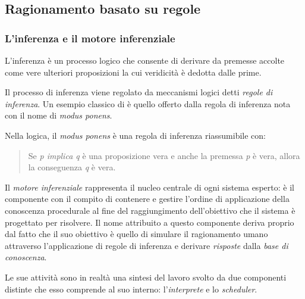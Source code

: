 \subsection{Ragionamento basato su regole}

\subsubsection{L'inferenza e il motore inferenziale}

L'inferenza è un processo logico che consente di derivare da premesse accolte come vere  ulteriori proposizioni la cui veridicità è dedotta dalle prime.

Il processo di inferenza viene regolato da meccanismi logici detti \emph{regole di inferenza}. Un esempio classico di è quello offerto dalla regola di inferenza nota con il nome di \emph{modus ponens}.

Nella logica, il \emph{modus ponens} è una regola di inferenza riassumibile con: \begin{quote}
Se \emph{p implica q} è una proposizione vera e anche la premessa \emph{p} è vera, allora la conseguenza \emph{q} è vera.
\end{quote}

Il \emph{motore inferenziale} rappresenta il nucleo centrale di ogni sistema esperto: è il componente con il compito di contenere e gestire l'ordine di applicazione della conoscenza procedurale al fine del raggiungimento dell'obiettivo che il sistema è progettato per risolvere. Il nome attribuito a questo componente deriva proprio dal fatto che il suo obiettivo è quello di simulare il ragionamento umano attraverso l'applicazione di regole di inferenza e derivare \emph{risposte} dalla \emph{base di conoscenza}.

Le sue attività sono in realtà una sintesi del lavoro svolto da due componenti distinte che esso comprende al suo interno: l'\emph{interprete} e lo \emph{scheduler}.~\cite{development1993}


